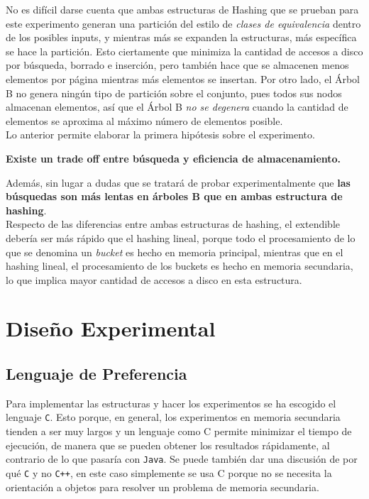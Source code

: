 \documentclass[12pt,letterpaper]{report}
\begin{document}
No es difícil darse cuenta que ambas estructuras de Hashing que se prueban para este experimento generan una partición del estilo de \emph{clases de equivalencia} dentro de los posibles inputs, y mientras más se expanden la estructuras, más específica se hace la partición. Esto ciertamente que minimiza la cantidad de accesos a disco por búsqueda, borrado e inserción, pero también hace que se almacenen menos elementos por página mientras más elementos se insertan. Por otro lado, el Árbol B no genera ningún tipo de partición sobre el conjunto, pues todos sus nodos almacenan elementos, así que el Árbol B \emph{no se degenera} cuando la cantidad de elementos se aproxima al máximo número de elementos posible.\\

Lo anterior permite elaborar la primera hipótesis sobre el experimento.

\begin{center}
\textbf{Existe un trade off entre búsqueda y eficiencia de almacenamiento.}
\end{center}

Además, sin lugar a dudas que se tratará de probar experimentalmente que \textbf{las búsquedas son más lentas en árboles B que en ambas estructura de hashing}.\\

Respecto de las diferencias entre ambas estructuras de hashing, el extendible debería ser más rápido que el hashing lineal, porque todo el procesamiento de lo que se denomina un \emph{bucket} es hecho en memoria principal, mientras que en el hashing lineal, el procesamiento de los buckets es hecho en memoria secundaria, lo que implica mayor cantidad de accesos a disco en esta estructura.


\newpage
\section{Diseño Experimental}

\subsection{Lenguaje de Preferencia}

Para implementar las estructuras y hacer los experimentos se ha escogido el lenguaje \texttt{C}. Esto porque, en general, los experimentos en memoria secundaria tienden a ser muy largos y un lenguaje como C permite minimizar el tiempo de ejecución, de manera que se pueden obtener los resultados rápidamente, al contrario de lo que pasaría con \texttt{Java}. Se puede también dar una discusión de por qué \texttt{C} y no \texttt{C++}, en este caso simplemente se usa C porque no se necesita la orientación a objetos para resolver un problema de memoria secundaria.
\end{document}
